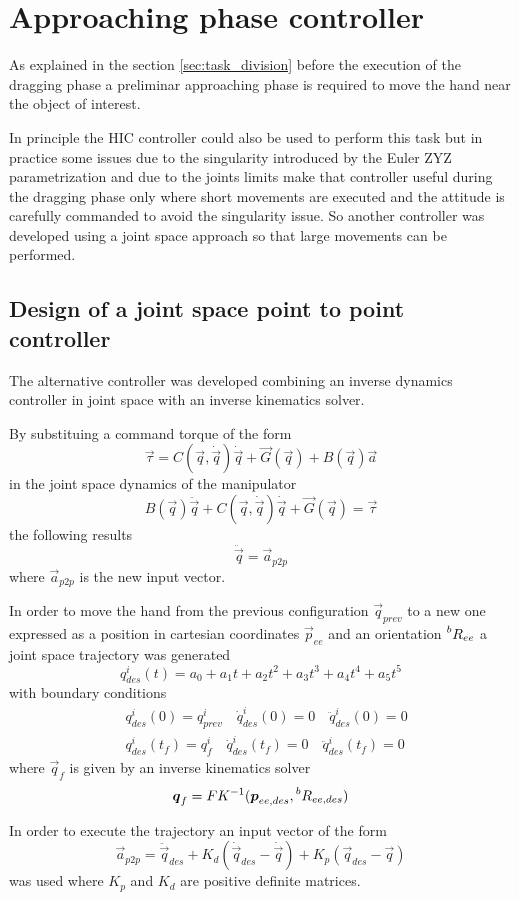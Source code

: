 \section{Approaching phase controller}
As explained in the section \ref{sec:task_division} before the execution of the dragging phase
a preliminar approaching phase is required  to move the hand near the object of interest.
\par
In principle the HIC controller could also be used to perform this task but in practice
some issues due to the singularity introduced by the Euler ZYZ parametrization and due to the
joints limits make that controller useful during the dragging phase only where short movements are executed
and the attitude is carefully commanded to avoid the singularity issue.
So another controller was developed using a joint space approach so that large movements can be performed.

\subsection{Design of a joint space point to point controller}
The alternative controller was developed combining an inverse dynamics controller in joint
space with an inverse kinematics solver.
\par
By substituing a command torque of the form
\[
\vec{\tau} = C(\vec{q}, \dot{\vec{q}}) \dot{\vec{q}} + \vec{G}(\vec{q}) + B(\vec{q}) \vec{a}
\]
in the joint space dynamics of the manipulator
\[
  B(\vec{q})\ddot{\vec{q}} + C(\vec{q}, \dot{\vec{q}}) \dot{\vec{q}} + \vec{G}(\vec{q}) = \vec{\tau}
\]
the following results
\[
\ddot{\vec{q}} = \vec{a}_{p2p}
\]
where $\vec{a}_{p2p}$ is the new input vector.
\par
In order to move the hand from the previous configuration $\vec{q}_{prev}$
to a new one expressed as a position in cartesian coordinates $\vec{p}_{ee}$ and
an orientation $\prescript{b}{}{R}_{ee}$ a joint space trajectory was generated
\[
q_{des}^{i}(t) = a_0 + a_1 t + a_2 t^2 + a_3 t^3 + a_4 t^4 + a_5 t^5
\]
with boundary conditions
\[
\begin{split}
  &q_{des}^{i}(0) = q_{prev}^{i} \quad \dot{q}_{des}^{i}(0) = 0 \quad \ddot{q}_{des}^{i}(0) = 0\\
  &q_{des}^{i}(t_f) = q_{f}^{i} \quad \dot{q}_{des}^{i}(t_f) = 0 \quad \ddot{q}_{des}^{i}(t_f) = 0
\end{split}
\]
where $\vec{q}_{f}$ is given by an inverse kinematics solver
\[
\vec{q}_{f} = FK^{-1}(\vec{p}_{ee,des},\prescript{b}{}{R}_{ee,des})
\]
\par
In order to execute the trajectory an input vector of the form
\[
\vec{a}_{p2p} = \ddot{\vec{q}}_{des} + K_d(\dot{\vec{q}}_{des} - \dot{\vec{q}}) + K_p(\vec{q}_{des} - \vec{q})
\]
was used where $K_p$ and $K_d$ are positive definite matrices.
\newpage
